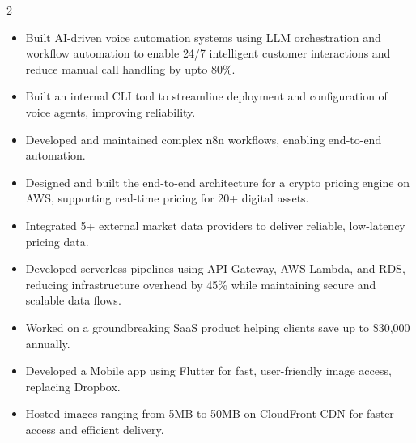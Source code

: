 \documentclass[10pt,a4paper]{altacv}
\begin{document}

\begin{fullwidth}
\makecvheader
\end{fullwidth}

\begin{paracol}{2}


\begin{itemize}
\item Built AI-driven voice automation systems using LLM orchestration and workflow automation to enable 24/7 intelligent customer interactions and reduce manual call handling by upto 80\%.
\item Built an internal CLI tool to streamline deployment and configuration of voice agents, improving reliability.
\item Developed and maintained complex n8n workflows, enabling end-to-end automation.
\end{itemize}
\divider

\begin{itemize}
\item Designed and built the end-to-end architecture for a crypto pricing engine on AWS, supporting real-time pricing for 20+ digital assets.
\item Integrated 5+ external market data providers to deliver reliable, low-latency pricing data.
\item Developed serverless pipelines using API Gateway, AWS Lambda, and RDS, reducing infrastructure overhead by 45\% while maintaining secure and scalable data flows.
\end{itemize}
\divider

\begin{itemize}
\item Worked on a groundbreaking SaaS product helping clients save up to \$30,000 annually.
\item Developed a Mobile app using Flutter for fast, user-friendly image access, replacing Dropbox.
\item Hosted images ranging from 5MB to 50MB on CloudFront CDN for faster access and efficient delivery.
\end{itemize}
\divider


\end{paracol}
\end{document}

